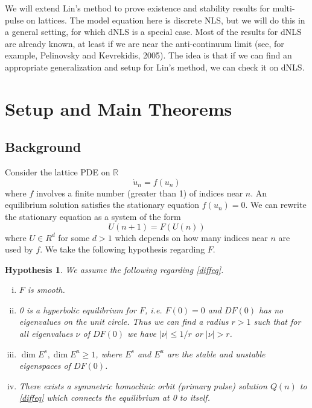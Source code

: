 \documentclass[12pt]{article}
\def\R{{\mathbb R}}
\newtheorem{hypothesis}{Hypothesis}
\begin{document}
We will extend Lin's method to prove existence and stability results for multi-pulse on lattices. The model equation here is discrete NLS, but we will do this in a general setting, for which dNLS is a special case. Most of the results for dNLS are already known, at least if we are near the anti-continuum limit (see, for example, Pelinovsky and Kevrekidis, 2005). The idea is that if we can find an appropriate generalization and setup for Lin's method, we can check it on dNLS. 

\section{Setup and Main Theorems}

\subsection{Background}
Consider the lattice PDE on $\R$
\begin{equation}\label{latticePDE}
\dot{u}_n = f(u_n)
\end{equation}
where $f$ involves a finite number (greater than 1) of indices near $n$. An equilibrium solution satisfies the stationary equation $f(u_n) = 0$. We can rewrite the stationary equation as a system of the form
\begin{equation}\label{diffeq}
U(n+1) = F(U(n))
\end{equation}
where $U \in R^d$ for some $d > 1$ which depends on how many indices near $n$ are used by $f$. We take the following hypothesis regarding $F$.
\begin{hypothesis}\label{initialhyp}
We assume the following regarding \eqref{diffeq}.
\begin{enumerate}[(i)]
\item $F$ is smooth.
\item 0 is a hyperbolic equilibrium for $F$, i.e. $F(0) = 0$ and $DF(0)$ has no eigenvalues on the unit circle. Thus we can find a radius $r > 1$ such that for all eigenvalues $\nu$ of $DF(0)$ we have $|\nu| \leq 1/r$ or $|\nu| > r$.
\item $\dim E^s, \dim E^u \geq 1$, where $E^s$ and $E^u$ are the stable and unstable eigenspaces of $DF(0)$.
\item There exists a symmetric homoclinic orbit (primary pulse) solution $Q(n)$ to \eqref{diffeq} which connects the equilibrium at 0 to itself.
\end{enumerate}
\end{hypothesis}
\end{document}
